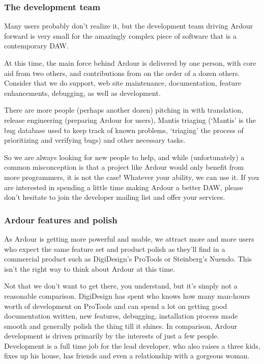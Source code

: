 \documentclass[10pt,a4paper]{book}
\begin{document}
\subsubsection{The development team}

Many users probably don't realize it, but the development team driving
Ardour forward is very small for the amazingly complex piece of
software that is a contemporary DAW\@.

At this time, the main force behind Ardour is delivered by one person,
with core aid from two others, and contributions from on the order of
a dozen others. Consider that we do support, web site maintenance,
documentation, feature enhancements, debugging, as well as
development.

There are more people (perhaps another dozen) pitching in with
translation, release engineering (preparing Ardour for users), Mantis
triaging (`Mantis' is the bug database used to keep track of known
problems, `triaging' the process of prioritizing and verifying bugs)
and other necessary tasks.

So we are always looking for new people to help, and while
(unfortunately) a common misconception is that a project like Ardour
would only benefit from more programmers, it is not the case! Whatever
your ability, we can use it. If you are interested in spending a
little time making Ardour a better DAW, please don't hesitate to join
the developer mailing list and offer your services.

\subsubsection{Ardour features and polish}

As Ardour is getting more powerful and usable, we attract more and
more users who expect the same feature set and product polish as
they'll find in a commercial product such as DigiDesign's ProTools or
Steinberg's Nuendo. This isn't the right way to think about Ardour at
this time.

Not that we don't want to get there, you understand, but it's simply
not a reasonable comparison. DigiDesign has spent who knows how many
man-hours worth of development on ProTools and can spend a lot on
getting good documentation written, new features, debugging,
installation process made smooth and generally polish the thing till
it shines. In comparison, Ardour development is driven primarily by
the interests of just a few people. Development is a full time job for
the lead developer, who also raises a three kids, fixes up his house,
has friends and even a relationship with a gorgeous woman.
\end{document}

